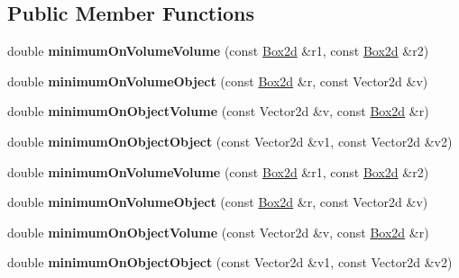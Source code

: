 \subsection*{Public Member Functions}
\begin{DoxyCompactItemize}
\item 
\mbox{\label{struct_point_point_minimizer_ae7733ff26813d46485ff8d289beeac4f}} 
double {\bfseries minimum\+On\+Volume\+Volume} (const \hyperlink{group___geometry___module_class_eigen_1_1_aligned_box}{Box2d} \&r1, const \hyperlink{group___geometry___module_class_eigen_1_1_aligned_box}{Box2d} \&r2)
\item 
\mbox{\label{struct_point_point_minimizer_afebefc4219d5157511194e5ab730fa0c}} 
double {\bfseries minimum\+On\+Volume\+Object} (const \hyperlink{group___geometry___module_class_eigen_1_1_aligned_box}{Box2d} \&r, const Vector2d \&v)
\item 
\mbox{\label{struct_point_point_minimizer_aa32c0ec042e50105d899984294d534ee}} 
double {\bfseries minimum\+On\+Object\+Volume} (const Vector2d \&v, const \hyperlink{group___geometry___module_class_eigen_1_1_aligned_box}{Box2d} \&r)
\item 
\mbox{\label{struct_point_point_minimizer_af7608f73dba8298707104ef1d828f420}} 
double {\bfseries minimum\+On\+Object\+Object} (const Vector2d \&v1, const Vector2d \&v2)
\item 
\mbox{\label{struct_point_point_minimizer_ae7733ff26813d46485ff8d289beeac4f}} 
double {\bfseries minimum\+On\+Volume\+Volume} (const \hyperlink{group___geometry___module_class_eigen_1_1_aligned_box}{Box2d} \&r1, const \hyperlink{group___geometry___module_class_eigen_1_1_aligned_box}{Box2d} \&r2)
\item 
\mbox{\label{struct_point_point_minimizer_afebefc4219d5157511194e5ab730fa0c}} 
double {\bfseries minimum\+On\+Volume\+Object} (const \hyperlink{group___geometry___module_class_eigen_1_1_aligned_box}{Box2d} \&r, const Vector2d \&v)
\item 
\mbox{\label{struct_point_point_minimizer_aa32c0ec042e50105d899984294d534ee}} 
double {\bfseries minimum\+On\+Object\+Volume} (const Vector2d \&v, const \hyperlink{group___geometry___module_class_eigen_1_1_aligned_box}{Box2d} \&r)
\item 
\mbox{\label{struct_point_point_minimizer_af7608f73dba8298707104ef1d828f420}} 
double {\bfseries minimum\+On\+Object\+Object} (const Vector2d \&v1, const Vector2d \&v2)
\end{DoxyCompactItemize}
